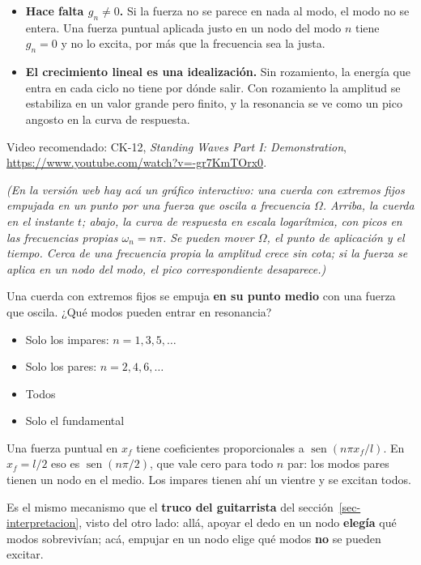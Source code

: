 \documentclass[
  spanish,
  a4paper,
]{scrbook}
\providecommand{\tightlist}{%
  \setlength{\itemsep}{0pt}\setlength{\parskip}{0pt}}
\theoremstyle{definition}
\theoremstyle{plain}
\theoremstyle{definition}
\theoremstyle{plain}
\theoremstyle{definition}
\theoremstyle{remark}
\begin{document}
\begin{itemize}
\tightlist
\item
  \textbf{Hace falta \(g_n\neq0\).} Si la fuerza no se parece en nada al
  modo, el modo no se entera. Una fuerza puntual aplicada justo en un
  nodo del modo \(n\) tiene \(g_n = 0\) y no lo excita, por más que la
  frecuencia sea la justa.
\item
  \textbf{El crecimiento lineal es una idealización.} Sin rozamiento, la
  energía que entra en cada ciclo no tiene por dónde salir. Con
  rozamiento la amplitud se estabiliza en un valor grande pero finito, y
  la resonancia se ve como un pico angosto en la curva de respuesta.
\end{itemize}

Video recomendado: CK-12, \emph{Standing Waves Part I: Demonstration},
\url{https://www.youtube.com/watch?v=-gr7KmTOrx0}.

\emph{(En la versión web hay acá un gráfico interactivo: una cuerda con
extremos fijos empujada en un punto por una fuerza que oscila a
frecuencia \(\Omega\). Arriba, la cuerda en el instante \(t\); abajo, la
curva de respuesta en escala logarítmica, con picos en las frecuencias
propias \(\omega_n = n\pi\). Se pueden mover \(\Omega\), el punto de
aplicación y el tiempo. Cerca de una frecuencia propia la amplitud crece
sin cota; si la fuerza se aplica en un nodo del modo, el pico
correspondiente desaparece.)}

Una cuerda con extremos fijos se empuja \textbf{en su punto medio} con
una fuerza que oscila. ¿Qué modos pueden entrar en resonancia?

\begin{itemize}
\tightlist
\item
  {Solo los impares: \(n = 1, 3, 5, \dots\)}
\item
  {Solo los pares: \(n = 2, 4, 6, \dots\)}
\item
  {Todos}
\item
  {Solo el fundamental}
\end{itemize}

Una fuerza puntual en \(x_f\) tiene coeficientes proporcionales a
\(\operatorname{sen}(n\pi x_f/l)\). En \(x_f = l/2\) eso es
\(\operatorname{sen}(n\pi/2)\), que vale cero para todo \(n\) par: los
modos pares tienen un nodo en el medio. Los impares tienen ahí un
vientre y se excitan todos.

Es el mismo mecanismo que el \textbf{truco del guitarrista} del
sección~\ref{sec-interpretacion}, visto del otro lado: allá, apoyar el
dedo en un nodo \textbf{elegía} qué modos sobrevivían; acá, empujar en
un nodo elige qué modos \textbf{no} se pueden excitar.
\end{document}
